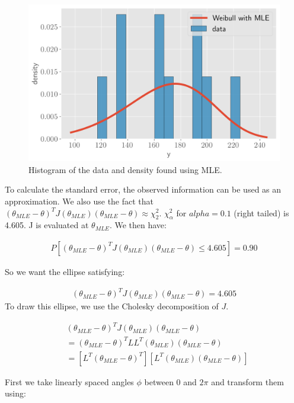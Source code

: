 \documentclass[11pt]{article}
\begin{document}
\begin{figure}[!h]
    \centering
    \includegraphics[scale=.55]{homework_2/figures/weibull_data_fit.png}
    \caption{Histogram of the data and density found using MLE.}
    \label{fig:my_label}
\end{figure}

To calculate the standard error, the observed information can be used as an approximation. We also use the fact that $(\theta_{MLE} - \theta)^T J(\theta_{MLE})(\theta_{MLE} -\theta) \approx \chi^2_2$. $\chi^2_{\alpha}$ for $alpha = 0.1$ (right tailed) is 4.605. J is evaluated at $\theta_{MLE}$. We then have:

\begin{align*}
    P[(\theta_{MLE} - \theta)^T J(\theta_{MLE})(\theta_{MLE} - \theta) \leq 4.605] = 0.90
\end{align*}

So we want the ellipse satisfying:

\begin{align*}
    (\theta_{MLE} - \theta)^T J(\theta_{MLE})(\theta_{MLE} - \theta) = 4.605
\end{align*}
To draw this ellipse, we use the Cholesky decomposition of $J$.

\begin{align*}
     & (\theta_{MLE} - \theta)^T J(\theta_{MLE})(\theta_{MLE} - \theta)\\
     &=  (\theta_{MLE} - \theta)^T LL^T(\theta_{MLE})(\theta_{MLE} - \theta)\\
       &=  [L^T(\theta_{MLE} - \theta)^T] [L^T(\theta_{MLE})(\theta_{MLE} - \theta)]
\end{align*}

First we take linearly spaced angles $\phi$ between 0 and $2\pi$ and transform them using:
\end{document}
